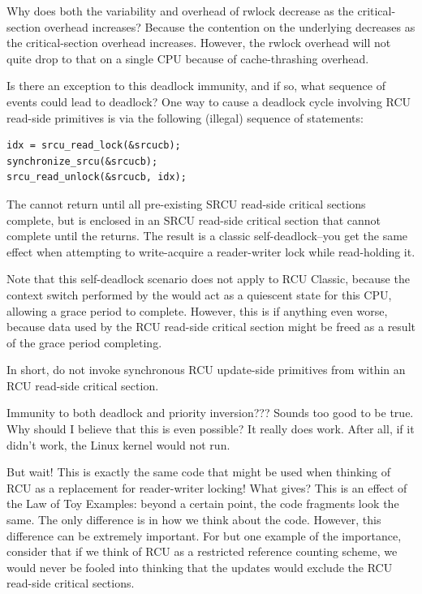 \begin{enumerate}
\QuickQ{}
	Why does both the variability and overhead of rwlock decrease as the
	critical-section overhead increases?
\QuickA{}
	Because the contention on the underlying
	 decreases as the critical-section overhead
	increases.
	However, the rwlock overhead will not quite drop to that on a single
	CPU because of cache-thrashing overhead.

\QuickQ{}
	Is there an exception to this deadlock immunity, and if so,
	what sequence of events could lead to deadlock?
\QuickA{}
	One way to cause a deadlock cycle involving
	RCU read-side primitives is via the following (illegal) sequence
	of statements:

\vspace{5pt}
\begin{minipage}[t]{\columnwidth}
\small
\begin{verbatim}
idx = srcu_read_lock(&srcucb);
synchronize_srcu(&srcucb);
srcu_read_unlock(&srcucb, idx);
\end{verbatim}
\end{minipage}
\vspace{5pt}

	The  cannot return until all
	pre-existing SRCU read-side critical sections complete, but
	is enclosed in an SRCU read-side critical section that cannot
	complete until the  returns.
	The result is a classic self-deadlock--you get the same
	effect when attempting to write-acquire a reader-writer lock
	while read-holding it.

	Note that this self-deadlock scenario does not apply to
	RCU Classic, because the context switch performed by the
	 would act as a quiescent state
	for this CPU, allowing a grace period to complete.
	However, this is if anything even worse, because data used
	by the RCU read-side critical section might be freed as a
	result of the grace period completing.

	In short, do not invoke synchronous RCU update-side primitives
	from within an RCU read-side critical section.

\QuickQ{}
	Immunity to both deadlock and priority inversion???
	Sounds too good to be true.
	Why should I believe that this is even possible?
\QuickA{}
	It really does work.
	After all, if it didn't work, the Linux kernel would not run.

\QuickQ{}
	But wait!
	This is exactly the same code that might be used when thinking
	of RCU as a replacement for reader-writer locking!
	What gives?
\QuickA{}
	This is an effect of the Law of Toy Examples:
	beyond a certain point, the code fragments look the same.
	The only difference is in how we think about the code.
	However, this difference can be extremely important.
	For but one example of the importance, consider that if we think
	of RCU as a restricted reference counting scheme, we would never
	be fooled into thinking that the updates would exclude the RCU
	read-side critical sections.


\end{enumerate}
